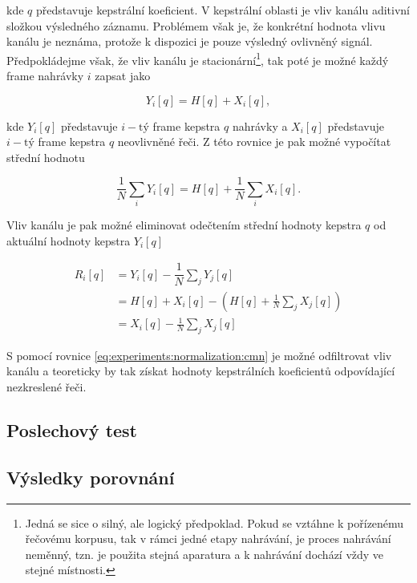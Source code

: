 \noindent kde $q$ představuje kepstrální koeficient. V kepstrální oblasti je vliv kanálu aditivní složkou výsledného záznamu. Problémem však je, že konkrétní hodnota vlivu kanálu je neznáma, protože k dispozici je pouze výsledný ovlivněný signál. Předpokládejme však, že vliv kanálu je stacionární\footnote{Jedná se sice o silný, ale logický předpoklad. Pokud se vztáhne k pořízenému řečovému korpusu, tak v rámci jedné etapy nahrávání, je proces nahrávání neměnný, tzn. je použita stejná aparatura a k nahrávání dochází vždy ve stejné místnosti.}, tak poté je možné každý frame nahrávky $i$ zapsat jako

\begin{equation}
  Y_i\left[q\right] = H\left[q\right] + X_i\left[q\right],
\end{equation}

\noindent kde $Y_i\left[q\right]$ představuje $i-\text{tý}$ frame kepstra $q$ nahrávky a $X_i\left[q\right]$ představuje $i-\text{tý}$ frame kepstra $q$ neovlivněné řeči. Z této rovnice je pak možné vypočítat střední hodnotu

\begin{equation}
  \frac{1}{N} \sum_i Y_i\left[q\right] = H\left[q\right] + \frac{1}{N} \sum_i X_i\left[q\right].
\end{equation}

\noindent Vliv kanálu je pak možné eliminovat odečtením střední hodnoty kepstra $q$ od aktuální hodnoty kepstra $Y_i\left[q\right]$

\begin{align}
  R_i\left[q\right] &= Y_i\left[q\right] - \dfrac{1}{N}\sum_{j} Y_j\left[q\right] \nonumber  \\
  &= H\left[q\right] + X_i\left[q\right] - \left( H\left[q\right] + \frac{1}{N} \sum_j X_j\left[q\right] \right) \nonumber  \\
  &= X_i\left[q\right] - \frac{1}{N} \sum_j X_j\left[q\right]
  \label{eq:experiments:normalization:cmn}
\end{align}

\noindent S pomocí rovnice \ref{eq:experiments:normalization:cmn} je možné odfiltrovat vliv kanálu a teoreticky by tak získat hodnoty kepstrálních koeficientů odpovídající nezkreslené řeči.

\subsection{Poslechový test}

\subsection{Výsledky porovnání}

